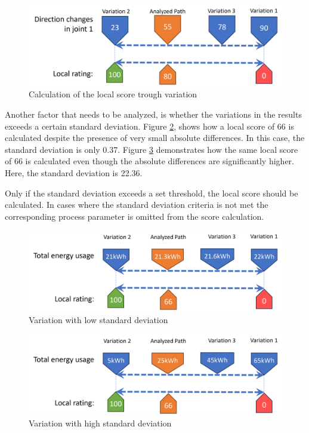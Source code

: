 \begin{figure}[H]
	\centerline{\includegraphics[scale=.6]{figures/localscore.png}}
	\caption{Calculation of the local score trough variation}
	\label{Localscore}
\end{figure}

Another factor that needs to be analyzed, is whether the variations in the results exceeds a certain standard deviation. Figure \ref{lowstd}, shows how a local score of 66 is calculated despite the presence of very small absolute differences. In this case, the standard deviation is only 0.37. Figure \ref{highstd} demonstrates how the same local score of 66 is calculated even though the absolute differences are significantly higher. Here, the standard deviation is 22.36.

Only if the standard deviation exceeds a set threshold, the local score should be calculated. In cases where the standard deviation criteria is not met the corresponding process parameter is omitted from the score calculation.

\begin{figure}[H]
	\centerline{\includegraphics[scale=.6]{figures/lowstd.png}}
	\caption{Variation with low standard deviation}
	\label{lowstd}
\end{figure}

\begin{figure}[H]
	\centerline{\includegraphics[scale=.6]{figures/highstd.png}}
	\caption{Variation with high standard deviation}
	\label{highstd}
\end{figure}

